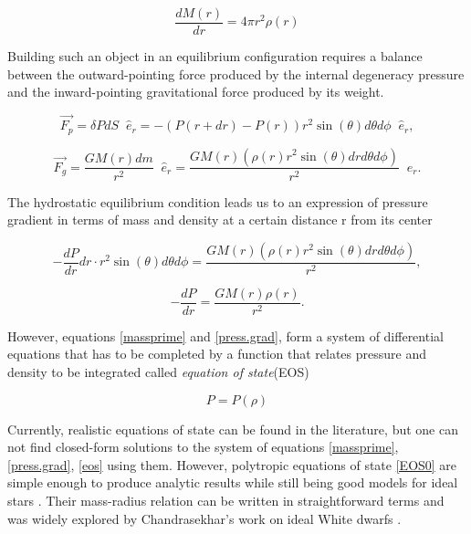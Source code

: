 \begin{equation}\label{massprime}
\frac{dM(r)}{dr} = 4\pi r^2 \rho(r) 
\end{equation}

Building such an object in an equilibrium configuration requires a balance between the outward-pointing force produced by the internal degeneracy pressure and the inward-pointing gravitational force produced by its weight. 

\begin{equation}\label{grav.f}
\vec{F_p} = \delta P dS\;\; \hat{e}_r = - \left(P(r+dr) - P(r) \right)  r^2 \sin (\theta) d\theta d\phi \;\; \hat{e}_r, 
\end{equation}

\begin{equation}\label{press.f}
\vec{F_g} = \frac{G M(r) dm}{r^2} \;\; \hat{e}_r = \frac{G M(r) (\rho(r) r^2 \sin(\theta) dr d\theta d\phi)}{r^2} \;\; \hat{e}_r.
\end{equation}

The hydrostatic equilibrium condition leads us to an expression of pressure gradient in terms of mass and density at a certain distance r from its center

\begin{equation}
-\frac{dP}{dr} dr \cdot r^2 \sin(\theta) d\theta d\phi = \frac{G M(r) (\rho(r) r^2 \sin(\theta) dr d\theta d\phi)}{r^2},
\end{equation}


\begin{equation}\label{press.grad}
-\frac{dP}{dr} = \frac{G M(r) \rho(r)}{r^2}. 
\end{equation}

However, equations \ref{massprime} and \ref{press.grad}, form a system of differential equations that has to be completed by a function that relates pressure and density to be integrated called \textit{equation of state}(EOS)

\begin{equation}\label{eos}
P = P(\rho)
\end{equation}

Currently, realistic equations of state \cite{Banik_2014,Steiner:2012rk,PhysRevD.79.124032} can be found in the literature, but one can not find closed-form solutions to the system of equations \ref{massprime}, \ref{press.grad}, \ref{eos} using them. However, polytropic equations of state \ref{EOS0} are simple enough to produce analytic results while still being good models for ideal stars \cite{Chandrasekhar:1931ih}. Their mass-radius relation can be written in straightforward terms and was widely explored by Chandrasekhar's work on ideal White dwarfs \cite{Shapiro:1983du,Chandrasekhar:1931ih, camenzind}. 

